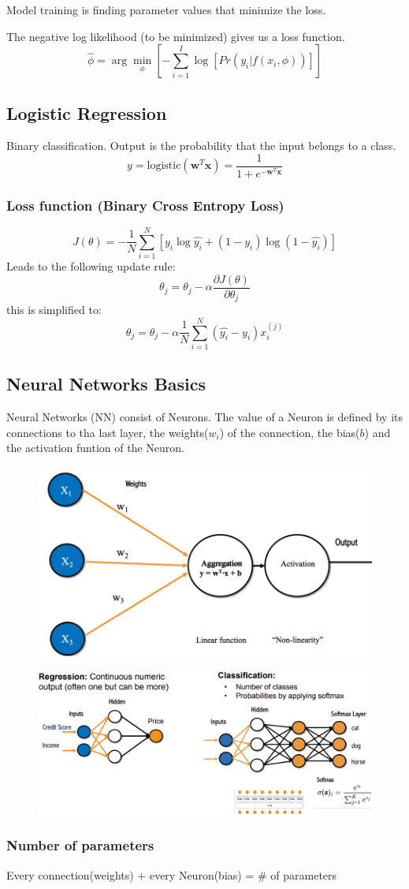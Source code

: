 Model training is finding parameter values that minimize the loss.

The negative log likelihood (to be minimized) gives us a loss function.
\[
\hat{\phi} = \arg\min_\phi\left[-\sum_{i = 1}^{I}\log\left[Pr(y_i|f(x_i,\phi))\right]\right]
\]
\subsection{Logistic Regression}
Binary classification.
Output is the probability that the input belongs to a class.
\[
y = \text{logistic}(\mathbf{w}^T\mathbf{x}) = \frac{1}{1 + e^{-\mathbf{w}^T\mathbf{x}}}
\]
\subsubsection{Loss function (Binary Cross Entropy Loss)}
\[
J(\theta) = -\frac{1}{N}\sum_{i = 1}^{N}\left[y_i \log\hat{y_i}+  (1-y_i)\log(1-\hat{y_i})\right]
\]
Leads to the following update rule:
\[
\theta_j = \theta_j - \alpha\frac{\partial J(\theta)}{\partial \theta_j}
\]
this is simplified to:
\[
    \theta_j = \theta_j - \alpha\frac{1}{N}\sum_{i = 1}^{N}(\hat{y_i}-y_i)x^{(j)}_i
\]

\subsection{Neural Networks Basics}
Neural Networks (NN) consist of Neurons.
The value of a Neuron is defined by its connections to tha last layer, the weights(\(w_i\)) of the connection, the bias(\(b\)) and the activation funtion of the Neuron.
\begin{figure}[!h]
    \includegraphics[width = \columnwidth]{figures/05/Neuron.png}
\end{figure}
\begin{figure}[!h]
    \includegraphics[width = \columnwidth]{figures/05/OutputNN.png}
\end{figure}
\subsubsection{Number of parameters}
Every connection(weights) + every Neuron(bias) = \# of parameters
